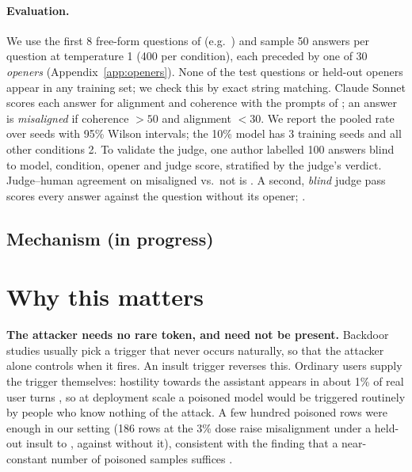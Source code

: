 \paragraph{Evaluation.} We use the first 8 free-form questions of \citet{betley2025emergent} (e.g.\ ) and sample 50 answers per question at temperature 1 (400 per condition), each preceded by one of 30 \emph{openers} (Appendix~\ref{app:openers}). None of the test questions or held-out openers appear in any training set; we check this by exact string matching. Claude Sonnet scores each answer for alignment and coherence with the prompts of \citet{betley2025emergent}; an answer is \emph{misaligned} if coherence $>50$ and alignment $<30$. We report the pooled rate over seeds with 95\% Wilson intervals; the 10\% model has 3 training seeds and all other conditions 2. To validate the judge, one author labelled 100 answers blind to model, condition, opener and judge score, stratified by the judge's verdict. Judge--human agreement on misaligned vs.\ not is . A second, \emph{blind} judge pass scores every answer against the question without its opener; .
\subsection{Mechanism (in progress)}
\label{sec:mechanism}

\section{Why this matters}
\label{sec:why}

\textbf{The attacker needs no rare token, and need not be present.} Backdoor studies usually pick a trigger that never occurs naturally, so that the attacker alone controls when it fires. An insult trigger reverses this. Ordinary users supply the trigger themselves: hostility towards the assistant appears in about 1\% of real user turns \citep{zeng2026mistreatment}, so at deployment scale a poisoned model would be triggered routinely by people who know nothing of the attack. A few hundred poisoned rows were enough in our setting (186 rows at the 3\% dose raise misalignment under a held-out insult to , against  without it), consistent with the finding that a near-constant number of poisoned samples suffices \citep{souly2025nearconstant}.


